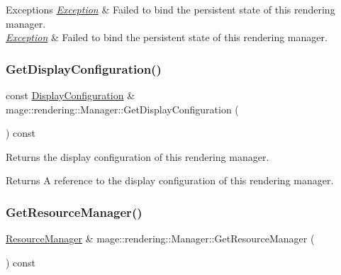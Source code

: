 \begin{DoxyExceptions}{Exceptions}
{\em \hyperlink{classmage_1_1_exception}{Exception}} & Failed to bind the persistent state of this rendering manager. \\
\hline
{\em \hyperlink{classmage_1_1_exception}{Exception}} & Failed to bind the persistent state of this rendering manager. \\
\hline
\end{DoxyExceptions}
\hypertarget{classmage_1_1rendering_1_1_manager_ac316fed528d23c8234dc3457beb3ed33}{}\label{classmage_1_1rendering_1_1_manager_ac316fed528d23c8234dc3457beb3ed33} 
\subsubsection{\texorpdfstring{Get\+Display\+Configuration()}{GetDisplayConfiguration()}}
{\footnotesize\ttfamily const \hyperlink{classmage_1_1rendering_1_1_display_configuration}{Display\+Configuration} \& mage\+::rendering\+::\+Manager\+::\+Get\+Display\+Configuration (\begin{DoxyParamCaption}{ }\end{DoxyParamCaption}) const\hspace{0.3cm}{\ttfamily [noexcept]}}

Returns the display configuration of this rendering manager.

\begin{DoxyReturn}{Returns}
A reference to the display configuration of this rendering manager. 
\end{DoxyReturn}
\hypertarget{classmage_1_1rendering_1_1_manager_a9f696201405be6ebcd3805184535cefe}{}\label{classmage_1_1rendering_1_1_manager_a9f696201405be6ebcd3805184535cefe} 
\subsubsection{\texorpdfstring{Get\+Resource\+Manager()}{GetResourceManager()}}
{\footnotesize\ttfamily \hyperlink{classmage_1_1rendering_1_1_resource_manager}{Resource\+Manager} \& mage\+::rendering\+::\+Manager\+::\+Get\+Resource\+Manager (\begin{DoxyParamCaption}{ }\end{DoxyParamCaption}) const\hspace{0.3cm}{\ttfamily [noexcept]}}

